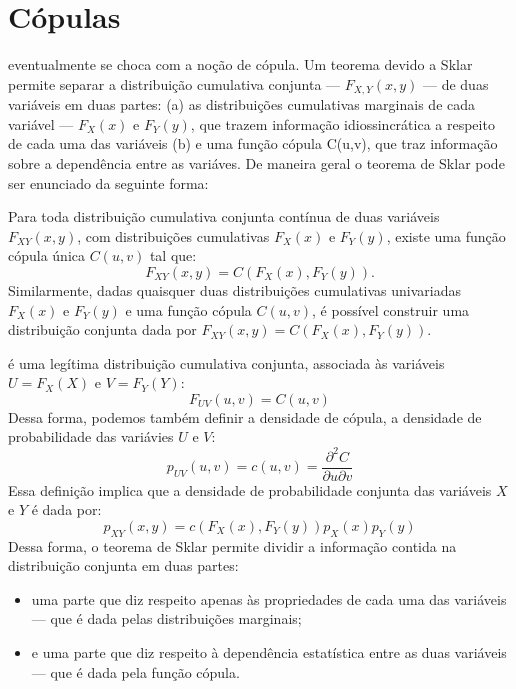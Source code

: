 \section{Cópulas}
 eventualmente se choca com a noção de cópula\cite{Nelsen2006}. Um teorema devido a Sklar\cite{Sklar1959} permite separar a distribuição cumulativa conjunta --- $F_{X,Y}(x,y)$ --- de duas variáveis em duas partes: (a) as distribuições cumulativas marginais de cada variável --- $F_{X}(x)$ e $F_{Y}(y)$, que trazem informação idiossincrática a respeito de cada uma das variáveis (b) e uma função cópula C(u,v), que traz informação sobre a dependência entre as variáves. De maneira geral o teorema de Sklar pode ser enunciado da seguinte forma:
\begin{Teorema}
Para toda distribuição cumulativa conjunta contínua de duas variáveis $F_{XY}(x,y)$, com distribuições cumulativas $F_X(x)$ e $F_Y(y)$, existe uma função cópula única $C(u,v)$ tal que:
\begin{equation}
 F_{XY}(x,y) = C(F_{X}(x), F_{Y}(y)).
\end{equation}
Similarmente, dadas quaisquer duas distribuições cumulativas univariadas $F_X(x)$ e $F_Y(y)$ e uma função cópula $C(u,v)$, é possível construir uma distribuição conjunta dada por $F_{XY}(x,y) = C(F_X(x),F_Y(y))$.
\end{Teorema}

 é uma legítima distribuição cumulativa conjunta, associada às variáveis $U = F_{X}(X)$ e $V = F_{Y}(Y)$:
\begin{equation*}
 F_{UV}(u,v) = C(u,v)
\end{equation*}
Dessa forma, podemos também definir a densidade de cópula, a densidade de probabilidade das variávies $U$ e $V$:
\begin{equation*}
 p_{UV}(u,v) = c(u,v) = \frac{\partial^2 C}{\partial u \partial v}
\end{equation*}
Essa definição implica que a densidade de probabilidade conjunta das variáveis $X$ e $Y$ é dada por:
\begin{equation}
\label{eq:density}
 p_{XY}(x,y) = c(F_X(x), F_Y(y)) p_X(x) p_Y(y)
\end{equation}
Dessa forma, o teorema de Sklar permite dividir a informação contida na distribuição conjunta em duas partes: 
\begin{itemize}
 \item uma parte que diz respeito apenas às propriedades de cada uma das variáveis --- que é dada pelas distribuições marginais;
 \item e uma parte que diz respeito à dependência estatística entre as duas variáveis --- que é dada pela função cópula. 
\end{itemize}
 
